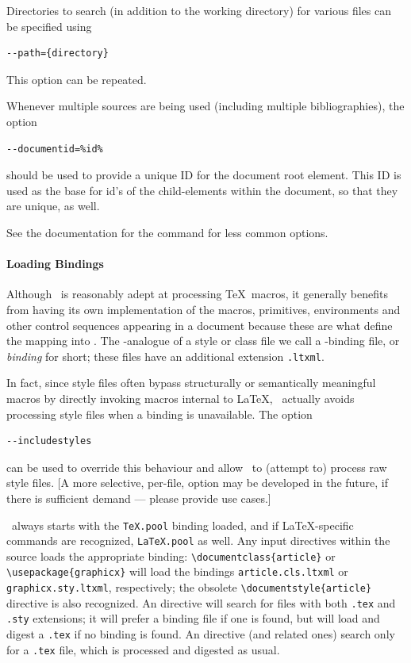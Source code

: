 \documentclass{book}
\begin{document}
Directories to search (in addition to the working directory)
for various files can be specified using
\begin{lstlisting}[style=shell]
--path={directory}
\end{lstlisting}
This option can be repeated.

Whenever multiple sources are being used (including multiple bibliographies),
the option
\begin{lstlisting}[style=shell]
--documentid=%id%
\end{lstlisting}
should be used to provide a unique ID for the document root element.
This ID is used as the base for id's of the child-elements within the document,
so that they are unique, as well.

See the documentation for the command  for
less common options.

\paragraph{Loading Bindings}\label{usage.conversion.loading}
Although \LaTeXML\ is reasonably adept at processing \TeX\ macros,
it generally benefits from having its own implementation of
the macros, primitives, environments and other control sequences
appearing in a document because these are what define the mapping into \XML.
The \LaTeXML-analogue of a style or class file we call a
\LaTeXML-binding file, or \emph{binding} for short;
these files have an additional extension \texttt{.ltxml}.

In fact, since style files often bypass structurally or semantically
meaningful macros by directly invoking macros internal to \LaTeX,
\LaTeXML\ actually avoids processing style files when a binding is unavailable.
The option
\begin{lstlisting}[style=shell]
--includestyles
\end{lstlisting}
can be used to override this behaviour and allow \LaTeXML\ to
(attempt to) process raw style files.
[A more selective, per-file, option may be developed in the future,
if there is sufficient demand --- please provide use cases.]

\LaTeXML\ always starts with the \texttt{TeX.pool} binding loaded,
and if \LaTeX-specific commands are recognized, \texttt{LaTeX.pool} as well.
Any input directives within the source loads the appropriate binding:
\verb|\documentclass{article}| or \verb|\usepackage{graphicx}|
will load the bindings \texttt{article.cls.ltxml} or \texttt{graphicx.sty.ltxml},
respectively; the obsolete \verb|\documentstyle{article}|
directive is also recognized.
An \verb|| directive will search for
files with both \texttt{.tex} and \texttt{.sty} extensions;
it will prefer a binding file if one is found,
but will load and digest a \texttt{.tex} if no binding is found.
An \verb|| directive (and related ones) search only for
a \texttt{.tex} file, which is processed and digested as usual.
\end{document}
